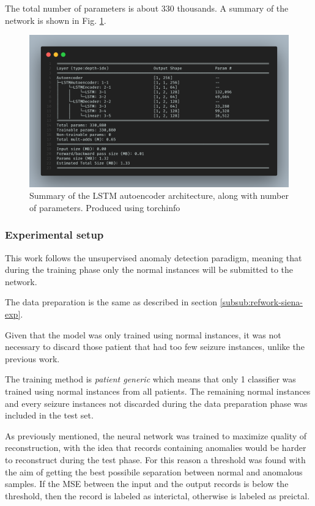 The total number of parameters is about 330 thousands. A summary of the network is shown in Fig. \ref{fig:lstm-summary}.

\begin{figure}[ht]
    \centering
    \includegraphics[width=1.0\textwidth]{images/State-of-art/lstm-summary.png}
    \caption{Summary of the LSTM autoencoder architecture, along with number of parameters. Produced using torchinfo \cite{yep_torchinfo_2020}}
    \label{fig:lstm-summary}
\end{figure}

\subsubsection{Experimental setup} \label{subsub:refwork-uab-exp}
This work follows the unsupervised anomaly detection paradigm, meaning that during the training phase only the normal instances will be submitted to the network.

The data preparation is the same as described in section \ref{subsub:refwork-siena-exp}.

Given that the model was only trained using normal instances, it was not necessary to discard those patient that had too few seizure instances, unlike the previous work.

The training method is \textit{patient generic} which means that only 1 classifier was trained using normal instances from all patients. The remaining normal instances and every seizure instances not discarded during the data preparation phase was included in the test set.

As previously mentioned, the neural network was trained to maximize quality of reconstruction, with the idea that records containing anomalies would be harder to reconstruct during the test phase. For this reason a threshold was found with the aim of getting the best possibile separation between normal and anomalous samples. If the \gls{MSE} between the input and the output records is below the threshold, then the record is labeled as interictal, otherwise is labeled as preictal.

